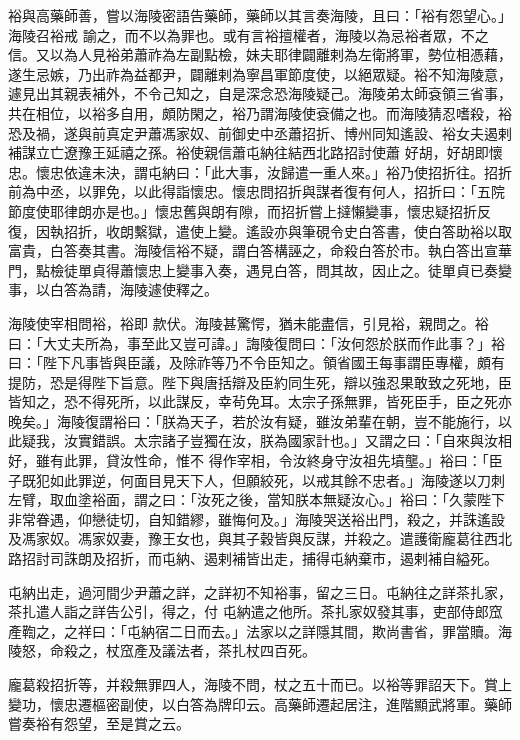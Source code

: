 \begin{pinyinscope}
 裕與高藥師善，嘗以海陵密語告藥師，藥師以其言奏海陵，且曰：「裕有怨望心。」海陵召裕戒
 諭之，而不以為罪也。或有言裕擅權者，海陵以為忌裕者眾，不之信。又以為人見裕弟蕭祚為左副點檢，妹夫耶律闢離剌為左衛將軍，勢位相憑藉，遂生忌嫉，乃出祚為益都尹，闢離剌為寧昌軍節度使，以絕眾疑。裕不知海陵意，遽見出其親表補外，不令己知之，自是深念恐海陵疑己。海陵弟太師袞領三省事，共在相位，以裕多自用，頗防閑之，裕乃謂海陵使袞備之也。而海陵猜忍嗜殺，裕恐及禍，遂與前真定尹蕭馮家奴、前御史中丞蕭招折、博州同知遙設、裕女夫遏剌補謀立亡遼豫王延禧之孫。裕使親信蕭屯納往結西北路招討使蕭
 好胡，好胡即懷忠。懷忠依違未決，謂屯納曰：「此大事，汝歸遣一重人來。」裕乃使招折往。招折前為中丞，以罪免，以此得詣懷忠。懷忠問招折與謀者復有何人，招折曰：「五院節度使耶律朗亦是也。」懷忠舊與朗有隙，而招折嘗上撻懶變事，懷忠疑招折反復，因執招折，收朗繫獄，遣使上變。遙設亦與筆硯令史白答書，使白答助裕以取富貴，白答奏其書。海陵信裕不疑，謂白答構誣之，命殺白答於市。執白答出宣華門，點檢徒單貞得蕭懷忠上變事入奏，遇見白答，問其故，因止之。徒單貞已奏變事，以白答為請，海陵遽使釋之。



 海陵使宰相問裕，裕即
 款伏。海陵甚驚愕，猶未能盡信，引見裕，親問之。裕曰：「大丈夫所為，事至此又豈可諱。」誨陵復問曰：「汝何怨於朕而作此事？」裕曰：「陛下凡事皆與臣議，及除祚等乃不令臣知之。領省國王每事謂臣專權，頗有提防，恐是得陛下旨意。陛下與唐括辯及臣約同生死，辯以強忍果敢致之死地，臣皆知之，恐不得死所，以此謀反，幸茍免耳。太宗子孫無罪，皆死臣手，臣之死亦晚矣。」海陵復謂裕曰：「朕為天子，若於汝有疑，雖汝弟輩在朝，豈不能施行，以此疑我，汝實錯誤。太宗諸子豈獨在汝，朕為國家計也。」又謂之曰：「自來與汝相好，雖有此罪，貸汝性命，惟不
 得作宰相，令汝終身守汝祖先墳壟。」裕曰：「臣子既犯如此罪逆，何面目見天下人，但願絞死，以戒其餘不忠者。」海陵遂以刀刺左臂，取血塗裕面，謂之曰：「汝死之後，當知朕本無疑汝心。」裕曰：「久蒙陛下非常眷遇，仰戀徒切，自知錯繆，雖悔何及。」海陵哭送裕出門，殺之，并誅遙設及馮家奴。馮家奴妻，豫王女也，與其子穀皆與反謀，并殺之。遣護衛龐葛往西北路招討司誅朗及招折，而屯納、遏剌補皆出走，捕得屯納棄市，遏剌補自縊死。



 屯納出走，過河間少尹蕭之詳，之詳初不知裕事，留之三日。屯納往之詳茶扎家，茶扎遣人詣之詳告公引，得之，付
 屯納遣之他所。茶扎家奴發其事，吏部侍郎窊產鞫之，之祥曰：「屯納宿二日而去。」法家以之詳隱其間，欺尚書省，罪當贖。海陵怒，命殺之，杖窊產及議法者，茶扎杖四百死。



 龐葛殺招折等，并殺無罪四人，海陵不問，杖之五十而已。以裕等罪詔天下。賞上變功，懷忠遷樞密副使，以白答為牌印云。高藥師遷起居注，進階顯武將軍。藥師嘗奏裕有怨望，至是賞之云。




\end{pinyinscope}

